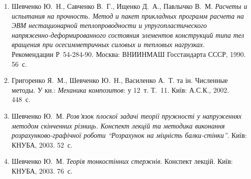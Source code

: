 \begin{enumerate}[leftmargin=*,label=\arabic*.,itemsep=0.25em,topsep=0.4em]
\item Шевченко Ю.~Н., Савченко В.~Г., Ищенко Д.~А., Павлычко В.~М. \emph{Расчеты и испытания на прочность. Метод и пакет прикладных программ расчета на ЭВМ нестационарной теплопроводности и упругопластического напряженно-деформированного состояния элементов конструкций типа тел вращения при осесимметричных силовых и тепловых нагрузках}. Рекомендации Р~54-284-90. Москва: ВНИИНМАШ Госстандарта СССР, 1990. 56~с.
\item Григоренко Я.~М., Шевченко Ю.~Н., Василенко А.~Т. та ін. Численные методы. У кн.: \emph{Механика композитов}: у 12~т. Т.~11. Київ: А.С.К., 2002. 448~с.
\item Шевченко Ю.~М. \emph{Розв'язок плоскої задачі теорії пружності у напруженнях методом скінченних різниць. Конспект лекцій та методика виконання розрахунково-графічної роботи ``Розрахунок на міцність балки-стінки''}. Київ: КНУБА, 2003. 52~с.
\item Шевченко Ю.~М. \emph{Теорія тонкостінних стержнів}. Конспект лекцій. Київ: КНУБА, 2003. 76~с.
\end{enumerate}
